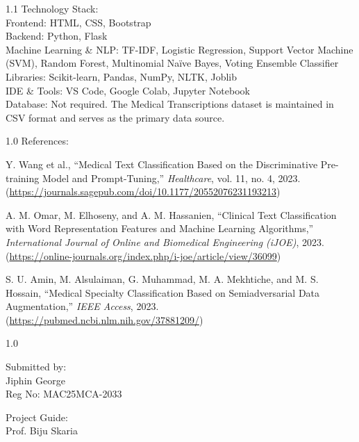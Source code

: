 \documentclass[12pt, a4paper]{article}
\begin{document}
\vspace{6pt}
\begin{spacing}{1.1}
\noindent Technology Stack: \\
Frontend: HTML, CSS, Bootstrap \\
Backend: Python, Flask \\
Machine Learning \& NLP: TF-IDF, Logistic Regression, Support Vector Machine (SVM), Random Forest, Multinomial Naïve Bayes, Voting Ensemble Classifier \\
Libraries: Scikit-learn, Pandas, NumPy, NLTK, Joblib \\
IDE \& Tools: VS Code, Google Colab, Jupyter Notebook \\
Database: Not required. The Medical Transcriptions dataset is maintained in CSV format and serves as the primary data source.
\end{spacing}

\vspace{8pt}
\begin{spacing}{1.0}
\noindent References:
\begin{enumerate}[label={[\arabic*]}, leftmargin=*, itemsep=0pt, parsep=0pt, topsep=2pt]
    \item Y. Wang et al., ``Medical Text Classification Based on the Discriminative Pre-training Model and Prompt-Tuning,'' \textit{Healthcare}, vol. 11, no. 4, 2023. (\url{https://journals.sagepub.com/doi/10.1177/20552076231193213})
    \item A. M. Omar, M. Elhoseny, and A. M. Hassanien, ``Clinical Text Classification with Word Representation Features and Machine Learning Algorithms,'' \textit{International Journal of Online and Biomedical Engineering (iJOE)}, 2023. (\url{https://online-journals.org/index.php/i-joe/article/view/36099})
    \item S. U. Amin, M. Alsulaiman, G. Muhammad, M. A. Mekhtiche, and M. S. Hossain, ``Medical Specialty Classification Based on Semiadversarial Data Augmentation,'' \textit{IEEE Access}, 2023. (\url{https://pubmed.ncbi.nlm.nih.gov/37881209/})
\end{enumerate}
\end{spacing}

\vfill %

\begin{spacing}{1.0}
\noindent
\begin{minipage}[t]{0.5\textwidth}
    Submitted by: \\
    Jiphin George \\
    Reg No: MAC25MCA-2033
\end{minipage}%
\begin{minipage}[t]{0.5\textwidth}
    \raggedleft
    Project Guide: \\
    Prof. Biju Skaria
\end{minipage}
\end{spacing}
\end{document}
